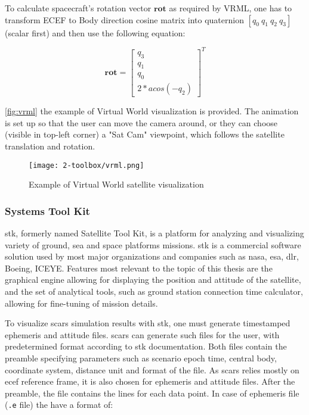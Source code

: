         To calculate spacecraft's rotation vector $\textbf{rot}$ as required by VRML, one has to transform ECEF to Body direction cosine matrix into quaternion $[q_0\: q_1\: q_2\: q_3]$ (scalar first) and then use the following equation:

        \begin{equation}
            \textbf{rot}=
            \begin{bmatrix}
                q_3\\
                q_1\\
                q_0\\
                2*acos(-q_2)
            \end{bmatrix}^T
        \end{equation}

        \autoref{fig:vrml} the example of Virtual World visualization is provided. The animation is set up so that the user can move the camera around, or they can choose (visible in top-left corner) a "Sat Cam" viewpoint, which follows the satellite translation and rotation.

        \begin{figure}[H]
            \centering
            \texttt{[image: 2-toolbox/vrml.png]}
            \caption{Example of Virtual World satellite visualization}
            \label{fig:vrml}
        \end{figure}
        

    \subsubsection{Systems Tool Kit}
        \ac{stk}, formerly named Satellite Tool Kit, is a platform for analyzing and visualizing variety of ground, sea and space platforms missions. \ac{stk} is a commercial software solution used by most major organizations and companies such as \ac{nasa}, \ac{esa}, \ac{dlr}, Boeing, ICEYE. Features most relevant to the topic of this thesis are the graphical engine allowing for displaying the position and attitude of the satellite, and the set of analytical tools, such as ground station connection time calculator, allowing for fine-tuning of mission details.

        To visualize \ac{scars} simulation results with \ac{stk}, one must generate timestamped ephemeris and attitude files. \ac{scars} can generate such files for the user, with predetermined format according to \ac{stk} documentation\cite{stkephemeris}. Both files contain the preamble specifying parameters such as scenario epoch time, central body, coordinate system, distance unit and format of the file. As \ac{scars} relies mostly on \ac{ecef} reference frame, it is also chosen for ephemeris and attitude files. After the preamble, the file contains the lines for each data point. In case of ephemeris file  (\verb|.e| file) the have a format of:

